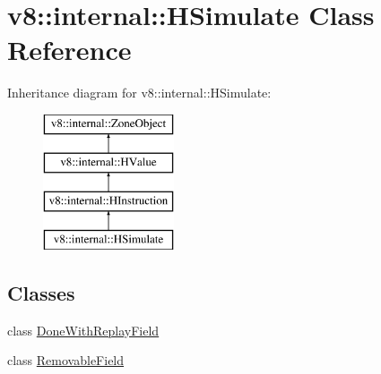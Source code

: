\hypertarget{classv8_1_1internal_1_1_h_simulate}{}\section{v8\+:\+:internal\+:\+:H\+Simulate Class Reference}
\label{classv8_1_1internal_1_1_h_simulate}
Inheritance diagram for v8\+:\+:internal\+:\+:H\+Simulate\+:\begin{figure}[H]
\begin{center}
\leavevmode
\includegraphics[height=4.000000cm]{classv8_1_1internal_1_1_h_simulate}
\end{center}
\end{figure}
\subsection*{Classes}
\begin{DoxyCompactItemize}
\item 
class \hyperlink{classv8_1_1internal_1_1_h_simulate_1_1_done_with_replay_field}{Done\+With\+Replay\+Field}
\item 
class \hyperlink{classv8_1_1internal_1_1_h_simulate_1_1_removable_field}{Removable\+Field}
\end{DoxyCompactItemize}

